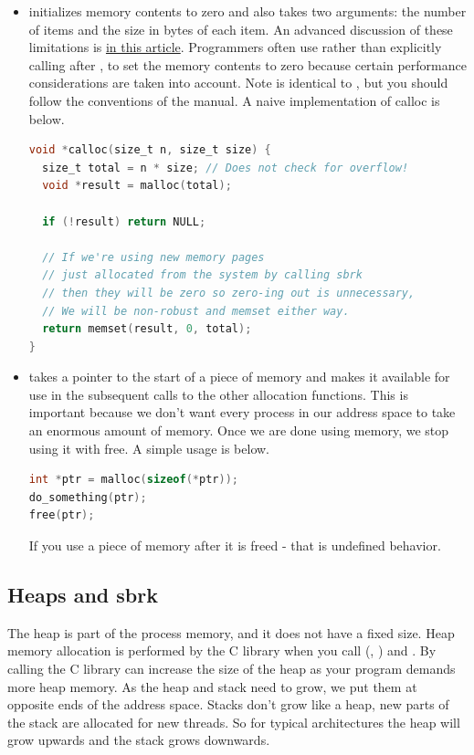 \begin{itemize}
\begin{lstlisting}[language=C]
}
\end{lstlisting}

\item {} initializes memory contents to zero and also takes two arguments: the number of items and the size in bytes of each item.
An advanced discussion of these limitations is \href{http://locklessinc.com/articles/calloc/}{in this article}.
Programmers often use  rather than explicitly calling  after , to set the memory contents to zero because certain performance considerations are taken into account.
Note  is identical to , but you should follow the conventions of the manual.
A naive implementation of calloc is below.

\begin{lstlisting}[language=C]
void *calloc(size_t n, size_t size) {
  size_t total = n * size; // Does not check for overflow!
  void *result = malloc(total);

  if (!result) return NULL;

  // If we're using new memory pages
  // just allocated from the system by calling sbrk
  // then they will be zero so zero-ing out is unnecessary,
  // We will be non-robust and memset either way.
  return memset(result, 0, total);
}
\end{lstlisting}

\item {} takes a pointer to the start of a piece of memory and makes it available for use in the subsequent calls to the other allocation functions.
This is important because we don't want every process in our address space to take an enormous amount of memory.
Once we are done using memory, we stop using it with free.
A simple usage is below.

\begin{lstlisting}[language=C]
int *ptr = malloc(sizeof(*ptr));
do_something(ptr);
free(ptr);
\end{lstlisting}

If you use a piece of memory after it is freed - that is undefined behavior.

\end{itemize}

\subsection{Heaps and sbrk}

The heap is part of the process memory, and it does not have a fixed size.
Heap memory allocation is performed by the C library when you call  (, ) and .
By calling  the C library can increase the size of the heap as your program demands more heap memory.
As the heap and stack need to grow, we put them at opposite ends of the address space.
Stacks don't grow like a heap, new parts of the stack are allocated for new threads.
So for typical architectures the heap will grow upwards and the stack grows downwards.

